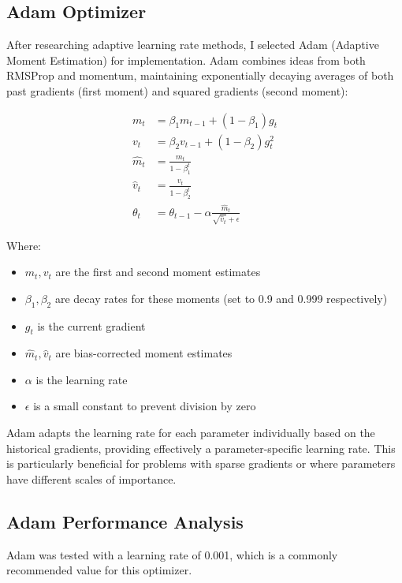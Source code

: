 \documentclass{article}
\begin{document}
\subsection{Adam Optimizer}

After researching adaptive learning rate methods, I selected Adam (Adaptive Moment Estimation) for implementation. Adam combines ideas from both RMSProp and momentum, maintaining exponentially decaying averages of both past gradients (first moment) and squared gradients (second moment):

\begin{align}
m_t &= \beta_1 m_{t-1} + (1-\beta_1)g_t \\
v_t &= \beta_2 v_{t-1} + (1-\beta_2)g_t^2 \\
\hat{m}_t &= \frac{m_t}{1-\beta_1^t} \\
\hat{v}_t &= \frac{v_t}{1-\beta_2^t} \\
\theta_t &= \theta_{t-1} - \alpha\frac{\hat{m}_t}{\sqrt{\hat{v}_t} + \epsilon}
\end{align}

Where:
\begin{itemize}
    \item $m_t, v_t$ are the first and second moment estimates
    \item $\beta_1, \beta_2$ are decay rates for these moments (set to 0.9 and 0.999 respectively)
    \item $g_t$ is the current gradient
    \item $\hat{m}_t, \hat{v}_t$ are bias-corrected moment estimates
    \item $\alpha$ is the learning rate
    \item $\epsilon$ is a small constant to prevent division by zero
\end{itemize}

Adam adapts the learning rate for each parameter individually based on the historical gradients, providing effectively a parameter-specific learning rate. This is particularly beneficial for problems with sparse gradients or where parameters have different scales of importance.

\subsection{Adam Performance Analysis}

Adam was tested with a learning rate of 0.001, which is a commonly recommended value for this optimizer.
\end{document}
